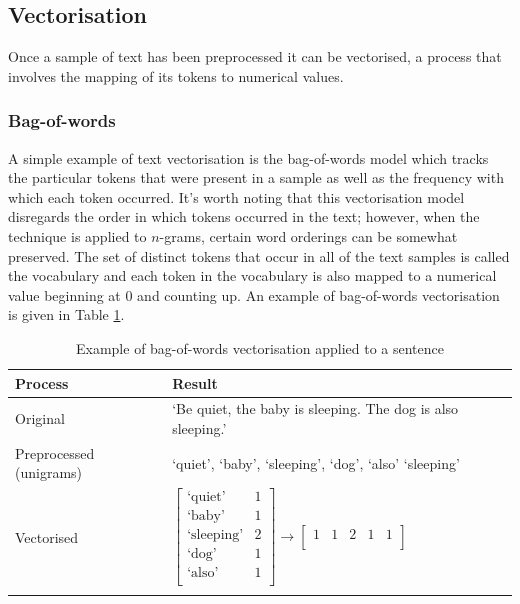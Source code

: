 \subsection{Vectorisation} \label{sec:TBG_Text_Vect}

Once a sample of text has been preprocessed it can be vectorised, a process that involves the mapping of its tokens to numerical values.

\subsubsection{Bag-of-words}

A simple example of text vectorisation is the bag-of-words model which tracks the particular tokens that were present in a sample as well as the frequency with which each token occurred. It's worth noting that this vectorisation model disregards the order in which tokens occurred in the text; however, when the technique is applied to $n$-grams, certain word orderings can be somewhat preserved. The set of distinct tokens that occur in all of the text samples is called the vocabulary and each token in the vocabulary is also mapped to a numerical value beginning at 0 and counting up. An example of bag-of-words vectorisation is given in Table \ref{tab:Explain_BOW}.

\begin{table}[ht]
    \centering
    \begin{tabular}{l l}
        \toprule
        \textbf{Process} & \textbf{Result} \\\midrule
        Original & `Be quiet, the baby is sleeping. The dog is also sleeping.'\\
        Preprocessed (unigrams) & `quiet', `baby', `sleeping', `dog', `also' `sleeping'\\
        Vectorised & $\begin{bmatrix} \text{`quiet'} & 1\\ \text{`baby'} & 1\\ \text{`sleeping'} & 2\\ \text{`dog'} & 1\\ \text{`also'} & 1\\ \end{bmatrix} \longrightarrow \begin{bmatrix} 1&1&2&1&1\\ \end{bmatrix}$\\
        \bottomrule\\
    \end{tabular}
    \caption{Example of bag-of-words vectorisation applied to a sentence}
    \label{tab:Explain_BOW}
\end{table}

